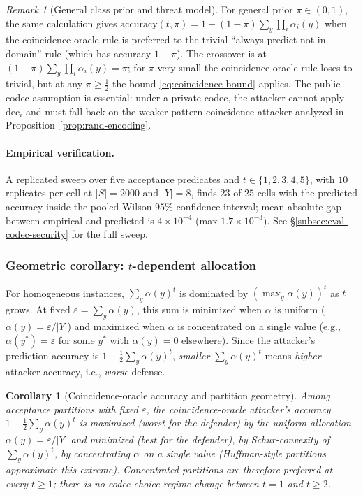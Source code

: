\documentclass[11pt]{article}
\theoremstyle{definition}
\theoremstyle{plain}
\newtheorem{corollary}[theorem]{Corollary}
\theoremstyle{remark}
\newtheorem{remark}{Remark}[section]
\newcommand{\dec}{\mathrm{dec}}
\begin{document}
\begin{remark}[General class prior and threat model]
\label{rem:coincidence-prior}
For general prior $\pi \in (0, 1)$, the same calculation gives
$\mathrm{accuracy}(t, \pi) = 1 - (1 - \pi) \sum_y \prod_i \alpha_i(y)$
when the coincidence-oracle rule is preferred to the trivial
``always predict not in domain'' rule (which has accuracy $1 - \pi$).
The crossover is at $(1 - \pi) \sum_y \prod_i \alpha_i(y) = \pi$;
for $\pi$ very small the coincidence-oracle rule loses to trivial,
but at any $\pi \geq \tfrac{1}{2}$ the bound \eqref{eq:coincidence-bound}
applies.  The public-codec assumption is essential: under a private
codec, the attacker cannot apply $\dec_i$ and must fall back on the
weaker pattern-coincidence attacker analyzed in
Proposition~\ref{prop:rand-encoding}.
\end{remark}

\paragraph{Empirical verification.}
A replicated sweep over five acceptance predicates and
$t \in \{1, 2, 3, 4, 5\}$, with $10$ replicates per cell at
$|S| = 2000$ and $|Y| = 8$, finds $23$ of $25$ cells with the
predicted accuracy inside the pooled Wilson $95\%$ confidence
interval; mean absolute gap between empirical and predicted is
$4 \times 10^{-4}$ (max $1.7 \times 10^{-3}$).  See
\S\ref{subsec:eval-codec-security} for the full sweep.

\subsubsection*{Geometric corollary: \texorpdfstring{$t$}{t}-dependent allocation}

For homogeneous instances, $\sum_y \alpha(y)^t$ is dominated by
$(\max_y \alpha(y))^t$ as $t$ grows.  At fixed $\varepsilon = \sum_y
\alpha(y)$, this sum is minimized when $\alpha$ is uniform
($\alpha(y) = \varepsilon / |Y|$) and maximized when $\alpha$ is
concentrated on a single value (e.g., $\alpha(y^*) = \varepsilon$ for
some $y^*$ with $\alpha(y) = 0$ elsewhere).  Since the attacker's
prediction accuracy is $1 - \tfrac{1}{2} \sum_y \alpha(y)^t$,
\emph{smaller} $\sum_y \alpha(y)^t$ means \emph{higher} attacker
accuracy, i.e., \emph{worse} defense.

\begin{corollary}[Coincidence-oracle accuracy and partition geometry]
\label{cor:t-geometry}
Among acceptance partitions with fixed $\varepsilon$, the
coincidence-oracle attacker's accuracy
$1 - \tfrac{1}{2} \sum_y \alpha(y)^t$ is maximized (worst for the
defender) by the uniform allocation $\alpha(y) = \varepsilon / |Y|$
and minimized (best for the defender), by Schur-convexity of
$\sum_y \alpha(y)^t$, by concentrating $\alpha$ on a single value
(Huffman-style partitions approximate this extreme).  Concentrated
partitions are therefore preferred at every $t \geq 1$; there is no
codec-choice regime change between $t = 1$ and $t \geq 2$.
\end{corollary}
\end{document}
